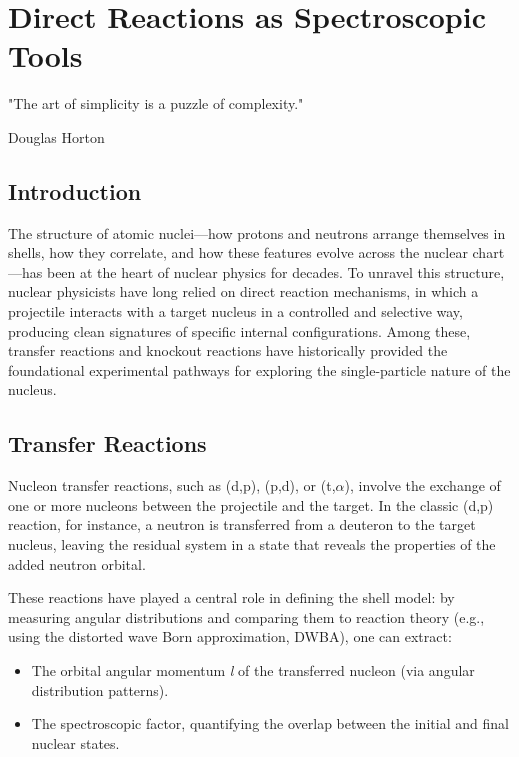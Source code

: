 
%

\chapter{Direct Reactions as Spectroscopic Tools}
\label{cha:reactions}


\epigraph{
	"The art of simplicity is a puzzle of complexity."
}{Douglas Horton}



\section{Introduction}
\label{sec:introduction}

The structure of atomic nuclei—how protons and neutrons arrange themselves in shells, how they correlate, and how these features evolve across the nuclear chart—has been at the heart of nuclear physics for decades. To unravel this structure, nuclear physicists have long relied on direct reaction mechanisms, in which a projectile interacts with a target nucleus in a controlled and selective way, producing clean signatures of specific internal configurations. Among these, transfer reactions and knockout reactions have historically provided the foundational experimental pathways for exploring the single-particle nature of the nucleus.


\section{Transfer Reactions}
\label{sec:transfer_reactions}

Nucleon transfer reactions, such as (d,p), (p,d), or (t,$\alpha$), involve the exchange of one or more nucleons between the projectile and the target. In the classic (d,p) reaction, for instance, a neutron is transferred from a deuteron to the target nucleus, leaving the residual system in a state that reveals the properties of the added neutron orbital.

These reactions have played a central role in defining the shell model: by measuring angular distributions and comparing them to reaction theory (e.g., using the distorted wave Born approximation, DWBA), one can extract:
\begin{itemize}
	\item The orbital angular momentum \emph{l} of the transferred nucleon (via angular distribution patterns).
	\item The spectroscopic factor, quantifying the overlap between the initial and final nuclear states.
\end{itemize}


